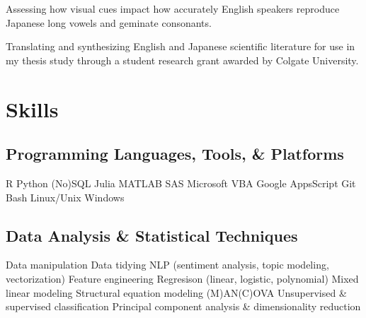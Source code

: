 \documentclass[letterpaper]{deedy-resume_sm} %
\begin{document}
\sectionspace %
\begin{tightitemize}
\item Assessing how visual cues impact how accurately English speakers reproduce Japanese long vowels and geminate consonants.
\end{tightitemize}
\sectionspace %
\begin{tightitemize}
\item Translating and synthesizing English and Japanese scientific literature for use in my thesis study through a student research grant awarded by Colgate University.
\end{tightitemize}
\sectionspace %

\section{Skills}
\subsection{Programming Languages, Tools, \& Platforms}
R \textbullet{} Python \textbullet{} (No)SQL \textbullet{} Julia \textbullet{} MATLAB \textbullet{} SAS \textbullet{} Microsoft VBA \textbullet{} Google AppsScript \textbullet{} Git \textbullet{} Bash \textbullet{} Linux/Unix \textbullet{} Windows
\sectionspace
\subsection{Data Analysis \& Statistical Techniques}
Data manipulation \textbullet{} Data tidying \textbullet{} NLP (sentiment analysis, topic modeling, vectorization) \textbullet{} Feature engineering \textbullet{} Regresison (linear, logistic, polynomial) \textbullet{} Mixed linear modeling \textbullet{} Structural equation modeling \textbullet{} (M)AN(C)OVA \textbullet{} Unsupervised \& supervised classification \textbullet{} Principal component analysis \& dimensionality reduction\\
\sectionspace
\end{document}
